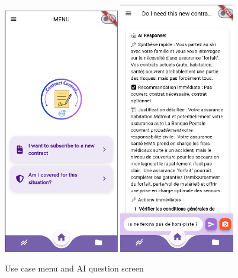\begin{figure}[H]
    \centering
    \includegraphics[width=0.45\textwidth]{frontend/menu.png}
    \hspace{0.05\textwidth}
    \includegraphics[width=0.45\textwidth]{frontend/usecase_1.png}
    \caption{Use case menu and AI question screen}
\end{figure}

